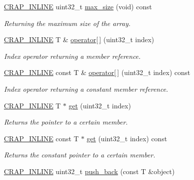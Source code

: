 \begin{DoxyCompactItemize}
\hyperlink{config__x86_8h_a5a40526b8d842e7ff731509998bb0f1c}{C\+R\+A\+P\+\_\+\+I\+N\+L\+I\+N\+E} uint32\+\_\+t \hyperlink{classcrap_1_1array_aec075c6b3b9af3688ef85bed2f19ef53}{max\+\_\+size} (void) const 
\begin{DoxyCompactList}\small\item\em Returning the maximum size of the array. \end{DoxyCompactList}\item 
\hyperlink{config__x86_8h_a5a40526b8d842e7ff731509998bb0f1c}{C\+R\+A\+P\+\_\+\+I\+N\+L\+I\+N\+E} T \& \hyperlink{classcrap_1_1array_a184cc666b60394822d131bb9676937ff}{operator\mbox{[}$\,$\mbox{]}} (uint32\+\_\+t index)
\begin{DoxyCompactList}\small\item\em Index operator returning a member reference. \end{DoxyCompactList}\item 
\hyperlink{config__x86_8h_a5a40526b8d842e7ff731509998bb0f1c}{C\+R\+A\+P\+\_\+\+I\+N\+L\+I\+N\+E} const T \& \hyperlink{classcrap_1_1array_a8f84b6feb0886aef202a86fc0ba5a862}{operator\mbox{[}$\,$\mbox{]}} (uint32\+\_\+t index) const 
\begin{DoxyCompactList}\small\item\em Index operator returning a constant member reference. \end{DoxyCompactList}\item 
\hyperlink{config__x86_8h_a5a40526b8d842e7ff731509998bb0f1c}{C\+R\+A\+P\+\_\+\+I\+N\+L\+I\+N\+E} T $\ast$ \hyperlink{classcrap_1_1array_a3daa9f7c2dfc0ea529507d8e1bed4def}{get} (uint32\+\_\+t index)
\begin{DoxyCompactList}\small\item\em Returns the pointer to a certain member. \end{DoxyCompactList}\item 
\hyperlink{config__x86_8h_a5a40526b8d842e7ff731509998bb0f1c}{C\+R\+A\+P\+\_\+\+I\+N\+L\+I\+N\+E} const T $\ast$ \hyperlink{classcrap_1_1array_a6b201791b042e2c4bdb5465741d77af6}{get} (uint32\+\_\+t index) const 
\begin{DoxyCompactList}\small\item\em Returns the constant pointer to a certain member. \end{DoxyCompactList}\item 
\hyperlink{config__x86_8h_a5a40526b8d842e7ff731509998bb0f1c}{C\+R\+A\+P\+\_\+\+I\+N\+L\+I\+N\+E} uint32\+\_\+t \hyperlink{classcrap_1_1array_afcc64517e2b719d1257eb8a4ed1a7eb9}{push\+\_\+back} (const T \&object)

\end{DoxyCompactItemize}

